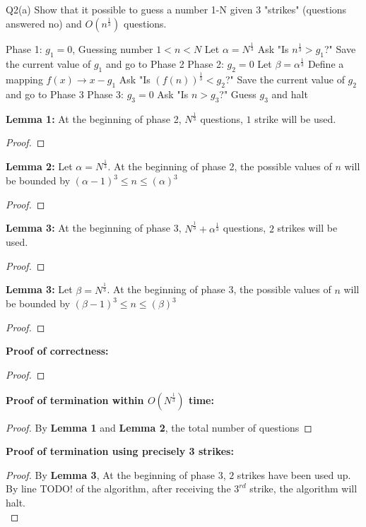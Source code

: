 \begin{problem}
  {Q2(a)}
  Show that it possible to guess a number 1-N given 3 "strikes" (questions answered no) and $O(n^{\frac{1}{3}})$ questions. \\
  \begin{algorithmic}[1]
    \STATE Phase 1: $g_1 = 0$, Guessing number $1 < n < N$
    \STATE Let $\alpha = N^{\frac{1}{3}}$
    \STATE Ask "Is $ n^{\frac{1}{3}} > g_1$?"
    \STATE Save the current value of $g_1$ and go to Phase 2
    \ENDIF
    \ENDFOR
    \STATE Phase 2: $g_2 = 0$
    \STATE Let $\beta = \alpha^{\frac{1}{3}}$
    \STATE Define a mapping $f(x) \rightarrow x - g_1$
    \STATE Ask "Is $(f(n))^{\frac{1}{3}} < g_2$?"
    \STATE Save the current value of $g_2$ and go to Phase 3
    \ENDIF
    \ENDFOR
    \STATE Phase 3: $g_3 = 0$
    \STATE Ask "Is $n > g_3$?"
    \STATE Guess $g_3$ and halt
    \ENDIF
    \ENDFOR
  \end{algorithmic}
  \textbf{Lemma 1:} At the beginning of phase 2, $N^{\frac{1}{3}}$ questions, $1$ strike will be used. \\
  \begin{proof}
  \end{proof}
  \textbf{Lemma 2:} Let $\alpha = N^{\frac{1}{3}}$. At the beginning of phase 2, the possible values of $n$ will be bounded by $(\alpha - 1)^3 \leq n \leq (\alpha)^3$ \\
  \begin{proof}
  \end{proof}
  \textbf{Lemma 3:} At the beginning of phase 3, $N^{\frac{1}{3}} + \alpha^{\frac{1}{3}}$ questions, $2$ strikes will be used. \\
  \begin{proof}
  \end{proof}
  \textbf{Lemma 3:} Let $\beta = N^{\frac{1}{3}}$. At the beginning of phase 3, the possible values of $n$ will be bounded by $(\beta - 1)^3 \leq n \leq (\beta)^3$ \\
  \begin{proof}
  \end{proof}
  \textbf{Proof of correctness:}
  \begin{proof}
  \end{proof}
  \textbf{Proof of termination within $O(N^{\frac{1}{3}})$ time:}
  \begin{proof}
  By \textbf{Lemma 1} and \textbf{Lemma 2}, the total number of questions
  \end{proof}
  \textbf{Proof of termination using precisely 3 strikes:}
  \begin{proof}
    By \textbf{Lemma 3}, At the beginning of phase 3, $2$ strikes have been used up. \\
    By line TODO! of the algorithm, after receiving the $3^{rd}$ strike, the algorithm will halt. \\
  \end{proof}
\end{problem}
